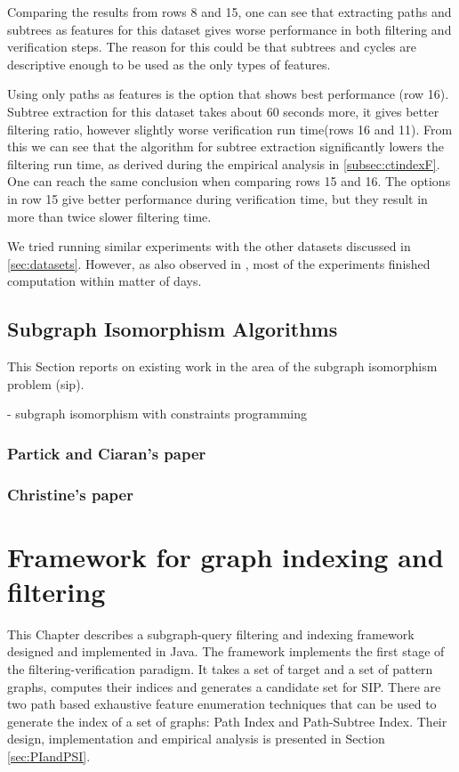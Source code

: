 \documentclass{l4proj}
\begin{document}
Comparing the results from rows 8 and 15, one can see that extracting paths and subtrees as features for this dataset gives worse performance in both filtering and verification steps. The reason for this could be that subtrees and cycles are descriptive enough to be used as the only types of features.

Using only paths as features is the option that shows best performance (row 16). Subtree extraction for this dataset takes about 60 seconds more, it gives better filtering ratio, however slightly worse verification run time(rows 16 and 11). From this we can see that the algorithm for subtree extraction significantly lowers the filtering run time, as derived during the empirical analysis in \ref{subsec:ctindexF}. One can reach the same conclusion when comparing rows 15 and 16. The options in row 15 give better performance during verification time, but they result in more than twice slower filtering time.

We tried running similar experiments with the other datasets discussed in \ref{sec:datasets}. However, as also observed in \cite{foteini}, most of the experiments finished computation within matter of days.


\section{Subgraph Isomorphism Algorithms}
\label{sec:sipalgos}
This Section reports on existing work in the area of the subgraph isomorphism problem (\gls{sip}).

- subgraph isomorphism with constraints programming

\subsection{Partick and Ciaran's paper}
\label{sec:sippatrick}

\subsection{Christine's paper}
\label{sec:sipchristine}

\chapter{Framework for graph indexing and filtering}
This Chapter describes a subgraph-query filtering and indexing framework designed and implemented in Java. The framework implements the first stage of the filtering-verification paradigm. It takes a set of target and a set of pattern graphs, computes their indices and generates a candidate set for SIP. There are two path based exhaustive feature enumeration techniques that can be used to generate the index of a set of graphs: Path Index and Path-Subtree Index. Their design, implementation and empirical analysis is presented in Section \ref{sec:PIandPSI}.
\end{document}
